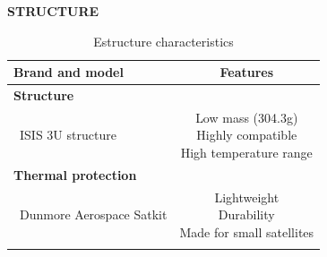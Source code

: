 \textbf{STRUCTURE}
\begin{longtable}{| l | c  }
	\hline
	\rowcolor[gray]{0.80}	\textbf{Brand and model} &  \textbf{Features}     \\
	\hline
	\endfirsthead
	
	\rowcolor[gray]{0.85} \textbf{Structure} &  \\
	~ISIS 3U structure & \makecell{Low mass (304.3g) \\ Highly compatible \\ High temperature range}\\
	\hline
	\rowcolor[gray]{0.85} \textbf{Thermal protection} &  \\
	~Dunmore Aerospace Satkit & \makecell{Lightweight \\ Durability \\ Made for small satellites}\\
	\hline
		
	\caption{Estructure characteristics}
	\label{structureoptions}
\end{longtable}

